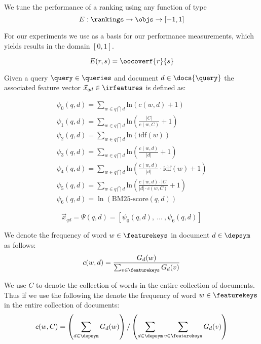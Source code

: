 \begin{definition}
  We tune the performance of a ranking using any function of type
  \[
    E :
      \rankings \rightarrow \objs \rightarrow [ -1, 1 ]
  \]

  For our experiments we use \oocover as a basis for our performance measurements,
  which yields results in the domain $[ 0, 1 ]$.

  \[
    E(r, s) = \oocoverf{r}{s}
  \]
\end{definition}

\begin{definition}
  Given a query $\query \in \queries$ and document $d \in \docs{\query}$ the
  associated feature vector ${\vec{x}}_{q d} \in \irfeatures$ is defined as:

  \[
  \begin{array}{l}
    \psi_0(q, d) = \sum_{w \in q \bigcap d} \text{ln}(c(w, d) + 1) \\
    \psi_1(q, d) = \sum_{w \in q \bigcap d} \text{ln}(\frac{|C|}{c(w, C)} + 1) \\
    \psi_2(q, d) = \sum_{w \in q \bigcap d} \text{ln}(\text{idf}(w)) \\
    \psi_3(q, d) = \sum_{w \in q \bigcap d} \text{ln}(\frac{c(w, d)}{|d|} + 1) \\
    \psi_4(q, d) = \sum_{w \in q \bigcap d} \text{ln}(\frac{c(w, d)}{|d|} \cdot \text{idf}(w) + 1) \\
    \psi_5(q, d) = \sum_{w \in q \bigcap d} \text{ln}(\frac{c(w, d) \cdot |C|}{|d| \cdot c(w, C)} + 1) \\
    \psi_6(q, d) = \ln( \text{BM25-score}(q, d) )
  \end{array}
  \]

  \[
    {\vec{x}}_{q d} = \Psi(q, d) = \left[ \psi_0(q, d), ~\ldots~, \psi_6(q, d) \right]
  \]
\end{definition}

\begin{definition}
  We denote the frequency of word $w \in \featurekeys$ in document $d \in \depsym$ as follows:
  \[ c(w, d) = \frac{G_d(w)}{ \sum_{v \in \featurekeys} G_d(v) }\]
\end{definition}

\begin{definition}
  We use $C$ to denote the collection of words in the entire collection of documents.
  Thus if we use the following the denote the frequency of word $w \in \featurekeys$
  in the entire collection of documents:
  \[ c(w, C) =
    \left( \sum_{d \in \depsym} G_d(w) \right) /
    \left( \sum_{d \in \depsym} \sum_{v \in \featurekeys} G_d(v) \right)
  \]
\end{definition}

